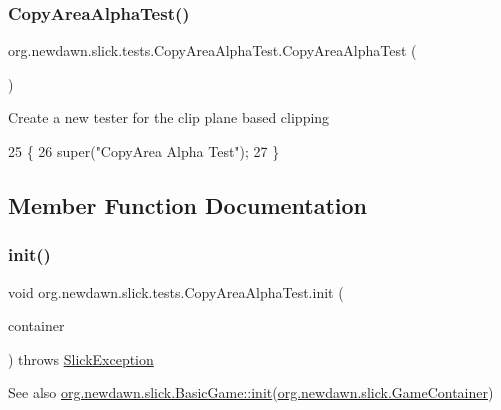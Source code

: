 \subsubsection{\texorpdfstring{Copy\+Area\+Alpha\+Test()}{CopyAreaAlphaTest()}}
{\footnotesize\ttfamily org.\+newdawn.\+slick.\+tests.\+Copy\+Area\+Alpha\+Test.\+Copy\+Area\+Alpha\+Test (\begin{DoxyParamCaption}{ }\end{DoxyParamCaption})\hspace{0.3cm}{\ttfamily [inline]}}

Create a new tester for the clip plane based clipping 
\begin{DoxyCode}
25                                \{
26         super(\textcolor{stringliteral}{"CopyArea Alpha Test"});
27     \}
\end{DoxyCode}


\subsection{Member Function Documentation}
\mbox{\label{classorg_1_1newdawn_1_1slick_1_1tests_1_1_copy_area_alpha_test_a14877413f55e6ff6cef16b2249105aad}} 
\subsubsection{\texorpdfstring{init()}{init()}}
{\footnotesize\ttfamily void org.\+newdawn.\+slick.\+tests.\+Copy\+Area\+Alpha\+Test.\+init (\begin{DoxyParamCaption}\item[{\mbox{\hyperlink{classorg_1_1newdawn_1_1slick_1_1_game_container}{Game\+Container}}}]{container }\end{DoxyParamCaption}) throws \mbox{\hyperlink{classorg_1_1newdawn_1_1slick_1_1_slick_exception}{Slick\+Exception}}\hspace{0.3cm}{\ttfamily [inline]}}

\begin{DoxySeeAlso}{See also}
\mbox{\hyperlink{classorg_1_1newdawn_1_1slick_1_1_basic_game_a8af0900217e4d389249f71367b22d114}{org.\+newdawn.\+slick.\+Basic\+Game\+::init}}(\mbox{\hyperlink{classorg_1_1newdawn_1_1slick_1_1_game_container}{org.\+newdawn.\+slick.\+Game\+Container}}) 
\end{DoxySeeAlso}


